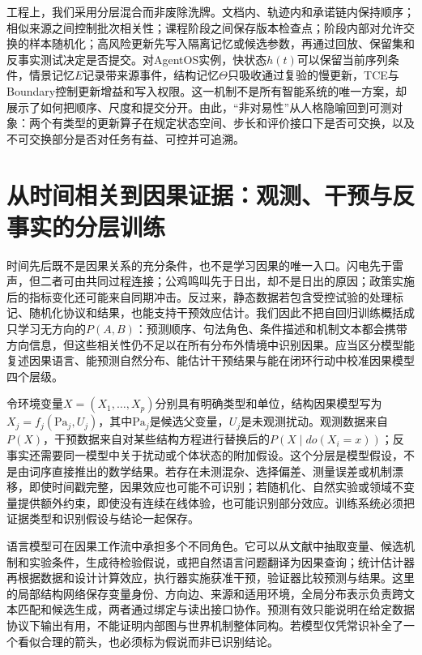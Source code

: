 工程上，我们采用分层混合而非废除洗牌。文档内、轨迹内和承诺链内保持顺序；相似来源之间控制批次相关性；课程阶段之间保存版本检查点；阶段内部对允许交换的样本随机化；高风险更新先写入隔离记忆或候选参数，再通过回放、保留集和反事实测试决定是否提交。对AgentOS实例，快状态$h(t)$可以保留当前序列条件，情景记忆$E$记录带来源事件，结构记忆$\Theta$只吸收通过复验的慢更新，TCE与Boundary控制更新增益和写入权限。这一机制不是所有智能系统的唯一方案，却展示了如何把顺序、尺度和提交分开。由此，“非对易性”从人格隐喻回到可测对象：两个有类型的更新算子在规定状态空间、步长和评价接口下是否可交换，以及不可交换部分是否对任务有益、可控并可追溯。

\section{从时间相关到因果证据：观测、干预与反事实的分层训练}
\label{sec:degeneration_of_causality}

时间先后既不是因果关系的充分条件，也不是学习因果的唯一入口。闪电先于雷声，但二者可由共同过程连接；公鸡鸣叫先于日出，却不是日出的原因；政策实施后的指标变化还可能来自同期冲击。反过来，静态数据若包含受控试验的处理标记、随机化协议和结果，也能支持干预效应估计。我们因此不把自回归训练概括成只学习无方向的$P(A,B)$：预测顺序、句法角色、条件描述和机制文本都会携带方向信息，但这些相关性仍不足以在所有分布外情境中识别因果。应当区分模型能复述因果语言、能预测自然分布、能估计干预结果与能在闭环行动中校准因果模型四个层级。

令环境变量$X=(X_1,\ldots,X_p)$分别具有明确类型和单位，结构因果模型写为$X_j=f_j(\mathrm{Pa}_j,U_j)$，其中$\mathrm{Pa}_j$是候选父变量，$U_j$是未观测扰动。观测数据来自$P(X)$，干预数据来自对某些结构方程进行替换后的$P(X\mid do(X_i=x))$；反事实还需要同一模型中关于扰动或个体状态的附加假设。这个分层是模型假设，不是由词序直接推出的数学结果。若存在未测混杂、选择偏差、测量误差或机制漂移，即使时间戳完整，因果效应也可能不可识别；若随机化、自然实验或领域不变量提供额外约束，即使没有连续在线体验，也可能识别部分效应。训练系统必须把证据类型和识别假设与结论一起保存。

语言模型可在因果工作流中承担多个不同角色。它可以从文献中抽取变量、候选机制和实验条件，生成待检验假说，或把自然语言问题翻译为因果查询；统计估计器再根据数据和设计计算效应，执行器实施获准干预，验证器比较预测与结果。这里的局部结构网络保存变量身份、方向边、来源和适用环境，全局分布表示负责跨文本匹配和候选生成，两者通过绑定与读出接口协作。预测有效只能说明在给定数据协议下输出有用，不能证明内部图与世界机制整体同构。若模型仅凭常识补全了一个看似合理的箭头，也必须标为假说而非已识别结论。

